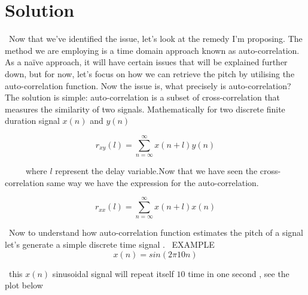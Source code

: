\documentclass[11pt,a4paper]{report}
\begin{document}
\section{Solution}
\ Now that we've identified the issue, let's look at the remedy I'm proposing.
The method we are employing is a time domain approach known as auto-correlation. As a naïve approach, it will have certain issues that will be explained further down, but for now, let's focus on how we can retrieve the pitch by utilising the auto-correlation function.
Now the issue is, what precisely is auto-correlation?
The solution is simple: auto-correlation is a subset of cross-correlation that measures the similarity of two signals.
Mathematically for two discrete finite duration signal $x(n)$ and $y(n)$

\begin{equation} r_{xy}(l) =  \sum_{n=\infty}^{\infty} x(n+l)y(n)   \end{equation}


\
\ 
\  
\    
\ where $l$ represent the delay variable.Now that we have seen the cross-correlation same way we have the expression for the auto-correlation.


\begin{equation} r_{xx}(l) =  \sum_{n=\infty}^{\infty} x(n+l)x(n)   \end{equation}


\ Now to understand how auto-correlation function estimates the pitch of a signal let's generate a simple discrete time signal . 
\ EXAMPLE
\[ x(n)  = sin(2\pi 10 n) \]

\ this $x(n)$ sinusoidal signal will repeat itself $10$ time in one second , see the plot below
\end{document}
